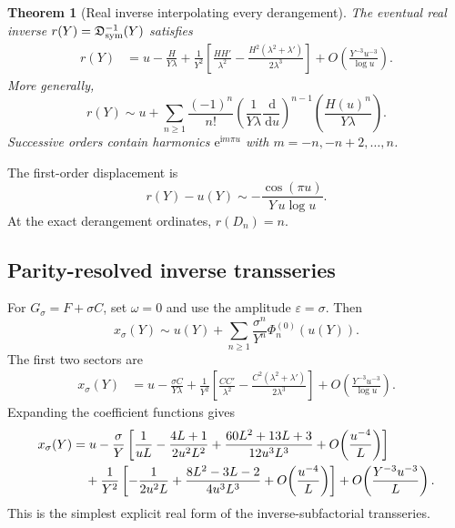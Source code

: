 \documentclass[11pt]{article}
\numberwithin{equation}{section}
\theoremstyle{mainthm}
\newtheorem{theorem}{Theorem}[section]
\theoremstyle{defstyle}
\theoremstyle{remark}
\newcommand{\e}{\mathrm e}
\newcommand{\ii}{\mathrm i}
\newcommand{\dd}{\,\mathrm d}
\newcommand{\Dsub}{\mathfrak D}
\begin{document}
\begin{theorem}[Real inverse interpolating every derangement]\label{thm:sym-inverse}
The eventual real inverse \(r(Y)=\Dsub_{\rm sym}^{-1}(Y)\) satisfies
\begin{align}
 r(Y)
 &=u-\frac{H}{Y\lambda}
 +\frac1{Y^2}\left[
 \frac{HH'}{\lambda^2}
 -\frac{H^2(\lambda^2+\lambda')}{2\lambda^3}
 \right]
 +O\!\left(\frac{Y^{-3}u^{-3}}{\log u}\right).
 \label{eq:sym-inverse-two-sector}
\end{align}
More generally,
\begin{equation}\label{eq:sym-inverse-all-order}
 r(Y)
 \sim u+\sum_{n\ge1}\frac{(-1)^n}{n!}
 \left(\frac1{Y\lambda}\frac{\dd}{\dd u}\right)^{n-1}
 \left(\frac{H(u)^n}{Y\lambda}\right).
\end{equation}
Successive orders contain harmonics \(\e^{\ii m\pi u}\) with \(m=-n,-n+2,\ldots,n\).
\end{theorem}

The first-order displacement is
\begin{equation}\label{eq:sym-leading}
 r(Y)-u(Y)
 \sim-\frac{\cos(\pi u)}{Y\,u\log u}.
\end{equation}
At the exact derangement ordinates, \(r(D_n)=n\).

\subsection{Parity-resolved inverse transseries}

For \(G_\sigma=F+\sigma C\), set \(\omega=0\) and use the amplitude \(\varepsilon=\sigma\).  Then
\begin{equation}\label{eq:parity-all-orders}
 \boxed{
 x_\sigma(Y)
 \sim u(Y)+\sum_{n\ge1}\frac{\sigma^n}{Y^n}\Phi_n^{(0)}(u(Y)).}
\end{equation}
The first two sectors are
\begin{align}
 x_\sigma(Y)
 &=u-\frac{\sigma C}{Y\lambda}
 +\frac1{Y^2}\left[
 \frac{CC'}{\lambda^2}
 -\frac{C^2(\lambda^2+\lambda')}{2\lambda^3}
 \right]
 +O\!\left(\frac{Y^{-3}u^{-3}}{\log u}\right).
 \label{eq:parity-two-sector-exact}
\end{align}
Expanding the coefficient functions gives
\begin{align}
 x_\sigma(Y)
 &=u-\frac{\sigma}{Y}
 \left[
 \frac1{uL}-\frac{4L+1}{2u^2L^2}
 +\frac{60L^2+13L+3}{12u^3L^3}
 +O\!\left(\frac{u^{-4}}{L}\right)
 \right]\notag\\
 &\quad+\frac1{Y^2}\left[
 -\frac1{2u^2L}
 +\frac{8L^2-3L-2}{4u^3L^3}
 +O\!\left(\frac{u^{-4}}{L}\right)
 \right]
 +O\!\left(\frac{Y^{-3}u^{-3}}{L}\right).
 \label{eq:parity-expanded}
\end{align}
This is the simplest explicit real form of the inverse-subfactorial transseries.
\end{document}
